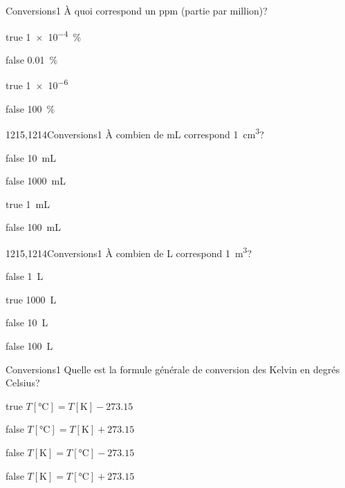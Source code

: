 \documentclass[11pt]{article}
\begin{document}
		\begin{question}{}{Conversions}{1}{}
			À quoi correspond un \si{ppm} (partie par million)?
        \end{question}
        \begin{reponses} 
            \item[true] \SI{1e-4}{\percent}
            \item[false] \SI{0.01}{\percent}
            \item[true] \num{1e-6}
    	    \item[false] \SI{100}{\percent}
        \end{reponses}
		\begin{question}{1215,1214}{Conversions}{1}{}
            À combien de \si{\milli\liter} correspond \SI{1}{\centi\meter\cubed}?
        \end{question}
        \begin{reponses}
            \item[false] \SI{10}{\milli\liter}
            \item[false] \SI{1000}{\milli\liter}
            \item[true] \SI{1}{\milli\liter}
            \item[false] \SI{100}{\milli\liter}
        \end{reponses}
        
        \begin{question}{1215,1214}{Conversions}{1}{}
            À combien de \si{\liter} correspond \SI{1}{\meter\cubed}?
        \end{question}
        \begin{reponses}
            \item[false] \SI{1}{\liter}
            \item[true] \SI{1000}{\liter}
            \item[false] \SI{10}{\liter}
            \item[false] \SI{100}{\liter}
        \end{reponses}
        
        \begin{question}{}{Conversions}{1}{}
            Quelle est la formule générale de conversion des Kelvin en degrés Celsius?
        \end{question}
        \begin{reponses}
            \item[true] $T[\si{\celsius}] = T[\si{\kelvin}] - \num{273.15}$
            \item[false] $T[\si{\celsius}] = T[\si{\kelvin}] + \num{273.15}$
            \item[false] $T[\si{\kelvin}] = T[\si{\celsius}] - \num{273.15}$
            \item[false] $T[\si{\kelvin}] = T[\si{\celsius}] + \num{273.15}$
        \end{reponses}
        
\end{document}
